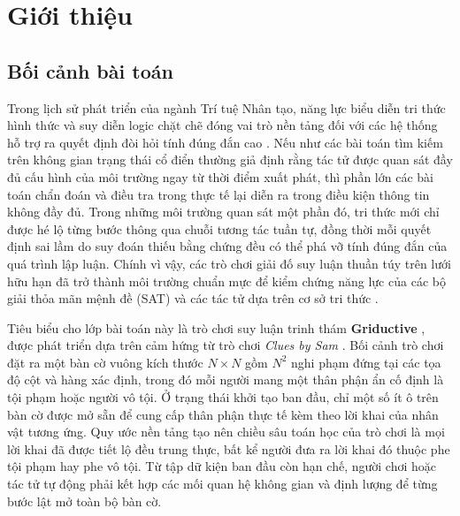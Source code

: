 \section{Giới thiệu}
\label{sec:introduction}

\subsection{Bối cảnh bài toán}
Trong lịch sử phát triển của ngành Trí tuệ Nhân tạo, năng lực biểu diễn tri thức
hình thức và suy diễn logic chặt chẽ đóng vai trò nền tảng đối với các hệ thống
hỗ trợ ra quyết định đòi hỏi tính đúng đắn cao \cite{russell2020aima}. Nếu
như các bài toán tìm kiếm trên không gian trạng thái cổ điển thường giả định rằng
tác tử được quan sát đầy đủ cấu hình của môi trường ngay từ thời điểm xuất phát,
thì phần lớn các bài toán chẩn đoán và điều tra trong thực tế lại diễn ra trong
điều kiện thông tin không đầy đủ. Trong những môi trường quan sát một phần đó,
tri thức mới chỉ được hé lộ từng bước thông qua chuỗi tương tác tuần tự, đồng
thời mỗi quyết định sai lầm do suy đoán thiếu bằng chứng đều có thể phá vỡ tính
đúng đắn của quá trình lập luận. Chính vì vậy, các trò chơi giải đố suy luận
thuần túy trên lưới hữu hạn đã trở thành môi trường chuẩn mực để kiểm chứng năng
lực của các bộ giải thỏa mãn mệnh đề (SAT) và các tác tử dựa trên cơ sở tri thức
\cite{biere2021handbook}.

Tiêu biểu cho lớp bài toán này là trò chơi suy luận trinh thám
\textbf{Griductive} \cite{griductive2025game}, được phát triển dựa trên cảm hứng
từ trò chơi \textit{Clues by Sam} \cite{cluesbysam2024game}. Bối cảnh trò chơi
đặt ra một bàn cờ vuông kích thước $N \times N$ gồm $N^2$ nghi phạm đứng tại các
tọa độ cột và hàng xác định, trong đó mỗi người mang một thân phận ẩn cố định là
tội phạm hoặc người vô tội. Ở trạng thái khởi tạo ban đầu, chỉ một số ít ô trên
bàn cờ được mở sẵn để cung cấp thân phận thực tế kèm theo lời khai của nhân vật
tương ứng. Quy ước nền tảng tạo nên chiều sâu toán học của trò chơi là mọi lời
khai đã được tiết lộ đều trung thực, bất kể người đưa ra lời khai đó thuộc phe
tội phạm hay phe vô tội. Từ tập dữ kiện ban đầu còn hạn chế, người chơi hoặc tác
tử tự động phải kết hợp các mối quan hệ không gian và định lượng để từng bước lật
mở toàn bộ bàn cờ.

